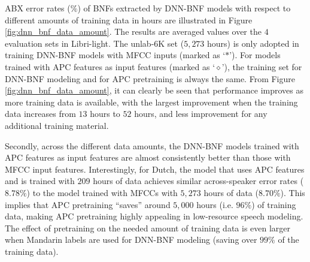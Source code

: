 \documentclass[a4paper]{article}
\begin{document}
ABX error rates ($\%$) of BNFs extracted by  DNN-BNF models with respect to different amounts of training data in hours are illustrated in Figure \ref{fig:dnn_bnf_data_amount}. The results are averaged values over the $4$ evaluation sets in  Libri-light. The unlab-6K set ($5,273$ hours)  is only adopted in training DNN-BNF models with MFCC inputs (marked as `$\ast$'). For models trained with APC features as input features (marked as `$\diamond$'), the training set for DNN-BNF modeling and for APC pretraining is always the same. From Figure \ref{fig:dnn_bnf_data_amount}, it can clearly be seen that 
performance improves as more training data is available, with the largest improvement when the training data increases from $13$  hours  to $52$ hours, and less improvement for any additional training material.

Secondly, across the different data amounts, the DNN-BNF models trained with APC features as input features are almost consistently better than those with MFCC input features. 
Interestingly, for Dutch, the model that uses APC features and is trained with $209$ hours of data achieves similar across-speaker error rates ($8.78\%$) to the model trained with MFCCs with $5,273$ hours of data ($8.70\%$). This implies that APC pretraining ``saves'' around $5,000$ hours (i.e.  $96\%$) of training data, making APC pretraining highly appealing in low-resource speech modeling. The effect of pretraining on the needed amount of training data is even larger when Mandarin labels are used for DNN-BNF modeling (saving over $99\%$ of the training data).
\end{document}
